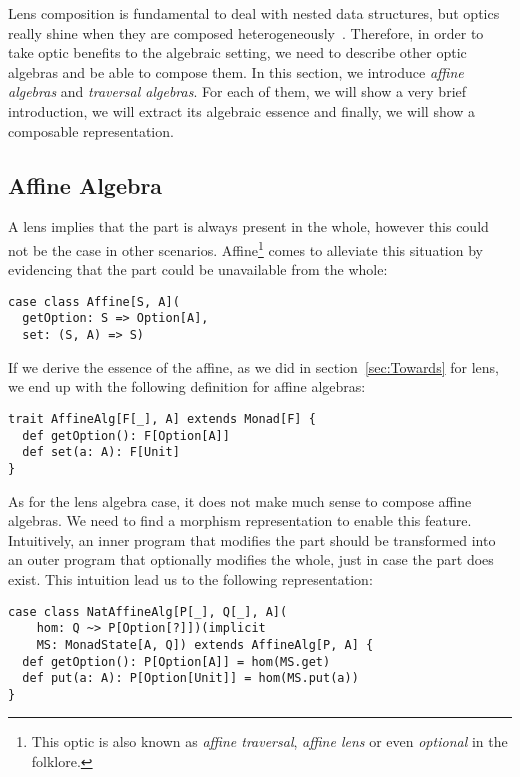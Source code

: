 \documentclass[preview, 3p]{elsarticle}
\begin{document}
Lens composition is fundamental to deal with nested data structures, but optics
really shine when they are composed
heterogeneously~\cite{pickering2017profunctor}. Therefore, in order to take
optic benefits to the algebraic setting, we need to describe other optic
algebras and be able to compose them. In this section, we introduce \emph{affine
algebras} and \emph{traversal algebras}. For each of them, we will show a very
brief introduction, we will extract its algebraic essence and finally, we will
show a composable representation.

\subsection{Affine Algebra}

A lens implies that the part is always present in the whole, however this could
not be the case in other scenarios. Affine\footnote{This optic is also known as
\emph{affine traversal}, \emph{affine lens} or even \emph{optional} in the
folklore.} comes to alleviate this situation by evidencing that the part could
be unavailable from the whole:

\begin{lstlisting}
case class Affine[S, A](
  getOption: S => Option[A],
  set: (S, A) => S)
\end{lstlisting}

If we derive the essence of the affine, as we did in section~\ref{sec:Towards}
for lens, we end up with the following definition for affine algebras:

\begin{lstlisting}
trait AffineAlg[F[_], A] extends Monad[F] {
  def getOption(): F[Option[A]]
  def set(a: A): F[Unit]
}
\end{lstlisting}

As for the lens algebra case, it does not make much sense to compose affine
algebras. We need to find a morphism representation to enable this feature.
Intuitively, an inner program that modifies the part should be transformed into
an outer program that optionally modifies the whole, just in case the part does
exist. This intuition lead us to the following representation:

\begin{lstlisting}
case class NatAffineAlg[P[_], Q[_], A](
    hom: Q ~> P[Option[?]])(implicit
    MS: MonadState[A, Q]) extends AffineAlg[P, A] {
  def getOption(): P[Option[A]] = hom(MS.get)
  def put(a: A): P[Option[Unit]] = hom(MS.put(a))
}
\end{lstlisting}
\end{document}
